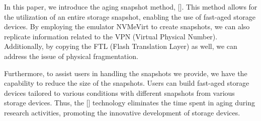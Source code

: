 In this paper, we introduce the aging snapshot method, [].
This method allows for the utilization of an entire storage snapshot, enabling the use of fast-aged storage devices.
By employing the emulator NVMeVirt to create snapshots, we can also replicate information related to the VPN (Virtual Physical Number).
Additionally, by copying the FTL (Flash Translation Layer) as well, we can address the issue of physical fragmentation.

Furthermore, to assist users in handling the snapshots we provide, we have the capability to reduce the size of the snapshots.
Users can build fast-aged storage devices tailored to various conditions with different snapshots from various storage devices.
Thus, the [] technology eliminates the time spent in aging during research activities, promoting the innovative development of storage devices.

